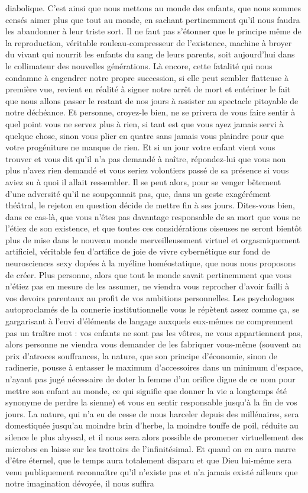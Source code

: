 diabolique. C’est ainsi que nous mettons au monde des enfants, que nous sommes censés aimer plus que tout au monde, en sachant pertinemment qu’il nous faudra les abandonner à leur triste sort. Il ne faut pas s’étonner que le principe même de la reproduction, véritable rouleau-compresseur de l’existence, machine à broyer du vivant qui nourrit les enfants du sang de leurs parents, soit aujourd’hui dans le collimateur des nouvelles générations. Là encore, cette fatalité qui nous condamne à engendrer notre propre succession, si elle peut sembler flatteuse à première vue, revient en réalité à signer notre arrêt de mort et entériner le fait que nous allons passer le restant de nos jours à assister au spectacle pitoyable de notre déchéance. Et personne, croyez-le bien, ne se privera de vous faire sentir à quel point vous ne servez plus à rien, si tant est que vous ayez jamais servi à quelque chose, sinon vous plier en quatre sans jamais vous plaindre pour que votre progéniture ne manque de rien. Et si un jour votre enfant vient vous trouver et vous dit qu’il n’a pas demandé à naître, répondez-lui que vous non plus n’avez rien demandé et vous seriez volontiers passé de sa présence si vous aviez su à quoi il allait ressembler. Il se peut alors, pour se venger bêtement d’une adversité qu’il ne soupçonnait pas, que, dans un geste exagérément théâtral, le rejeton en question décide de mettre fin à ses jours. Dites-vous bien, dans ce cas-là, que vous n’êtes pas davantage responsable de sa mort que vous ne l’étiez de son existence, et que toutes ces considérations oiseuses ne seront bientôt plus de mise dans le nouveau monde merveilleusement virtuel et orgasmiquement artificiel, véritable feu d’artifice de joie de vivre cybernétique sur fond de neurosciences sexy dopées à la myéline homéostatique, que nous nous proposons de créer. Plus personne, alors que tout le monde savait pertinemment que vous n’étiez pas en mesure de les assumer, ne viendra vous reprocher d’avoir failli à vos devoirs parentaux au profit de vos ambitions personnelles. Les psychologues autoproclamés de la connerie institutionnelle vous le répètent assez comme ça, se gargarisant à l’envi d’éléments de langage auxquels eux-mêmes ne comprennent pas un traître mot : vos enfants ne sont pas les vôtres, ne vous appartiennent pas, alors personne ne viendra vous demander de les fabriquer vous-même (souvent au prix d’atroces souffrances, la nature, que son principe d’économie, sinon de radinerie, pousse à entasser le maximum d’accessoires dans un minimum d’espace, n’ayant pas jugé nécessaire de doter la femme d’un orifice digne de ce nom pour mettre son enfant au monde, ce qui signifie que donner la vie a longtemps été synonyme de perdre la sienne) et vous en sentir responsable jusqu’à la fin de vos jours. La nature, qui n’a eu de cesse de nous harceler depuis des millénaires, sera domestiquée jusqu’au moindre brin d’herbe, la moindre touffe de poil, réduite au silence le plus abyssal, et il nous sera alors possible de promener virtuellement des microbes en laisse sur les trottoirs de l’infinitésimal. Et quand on en aura marre d’être éternel, que le temps aura totalement disparu et que Dieu lui-même sera venu publiquement reconnaître qu’il n’existe pas et n’a jamais existé ailleurs que notre imagination dévoyée, il nous suffira 
